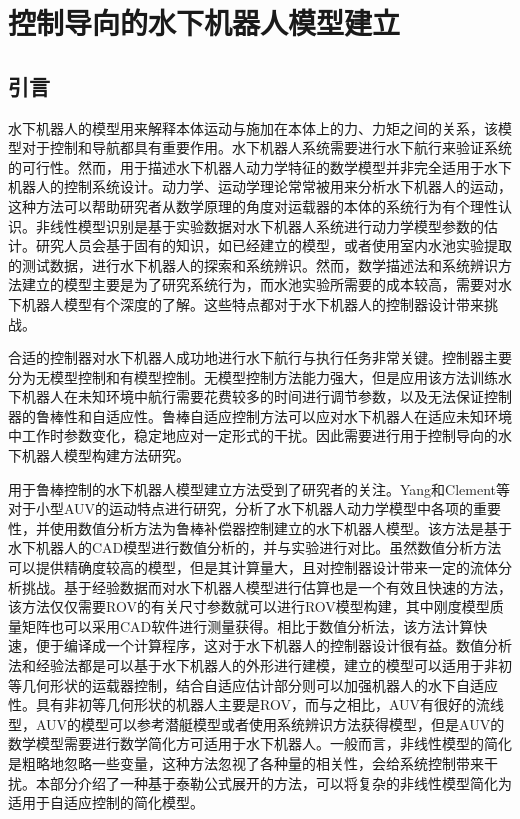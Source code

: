 


\chapter{控制导向的水下机器人模型建立}
\label{chap:modelingforcontrol}
\section{引言 }
水下机器人的模型用来解释本体运动与施加在本体上的力、力矩之间的关系，该模型对于控制和导航都具有重要作用。水下机器人系统需要进行水下航行来验证系统的可行性。然而，用于描述水下机器人动力学特征的数学模型并非完全适用于水下机器人的控制系统设计。动力学、运动学理论常常被用来分析水下机器人的运动，这种方法可以帮助研究者从数学原理的角度对运载器的本体的系统行为有个理性认识。非线性模型识别是基于实验数据对水下机器人系统进行动力学模型参数的估计。研究人员会基于固有的知识，如已经建立的模型，或者使用室内水池实验提取的测试数据，进行水下机器人的探索和系统辨识。然而，数学描述法和系统辨识方法建立的模型主要是为了研究系统行为，而水池实验所需要的成本较高，需要对水下机器人模型有个深度的了解。这些特点都对于水下机器人的控制器设计带来挑战。

合适的控制器对水下机器人成功地进行水下航行与执行任务非常关键。控制器主要分为无模型控制和有模型控制。无模型控制方法能力强大，但是应用该方法训练水下机器人在未知环境中航行需要花费较多的时间进行调节参数，以及无法保证控制器的鲁棒性和自适应性。鲁棒自适应控制方法可以应对水下机器人在适应未知环境中工作时参数变化，稳定地应对一定形式的干扰。因此需要进行用于控制导向的水下机器人模型构建方法研究。

用于鲁棒控制的水下机器人模型建立方法受到了研究者的关注。Yang和Clement等对于小型AUV的运动特点进行研究，分析了水下机器人动力学模型中各项的重要性，并使用数值分析方法为鲁棒补偿器控制建立的水下机器人模型\cite{yang2015modeling}。该方法是基于水下机器人的CAD模型进行数值分析的，并与实验进行对比。虽然数值分析方法可以提供精确度较高的模型，但是其计算量大，且对控制器设计带来一定的流体分析挑战。基于经验数据而对水下机器人模型进行估算也是一个有效且快速的方法，该方法仅仅需要ROV的有关尺寸参数就可以进行ROV模型构建，其中刚度模型质量矩阵也可以采用CAD软件进行测量获得。相比于数值分析法，该方法计算快速，便于编译成一个计算程序，这对于水下机器人的控制器设计很有益。数值分析法和经验法都是可以基于水下机器人的外形进行建模，建立的模型可以适用于非初等几何形状的运载器控制，结合自适应估计部分则可以加强机器人的水下自适应性。具有非初等几何形状的机器人主要是ROV，而与之相比，AUV有很好的流线型，AUV的模型可以参考潜艇模型或者使用系统辨识方法获得模型，但是AUV的数学模型需要进行数学简化方可适用于水下机器人。一般而言，非线性模型的简化是粗略地忽略一些变量，这种方法忽视了各种量的相关性，会给系统控制带来干扰。本部分介绍了一种基于泰勒公式展开的方法，可以将复杂的非线性模型简化为适用于自适应控制的简化模型。


